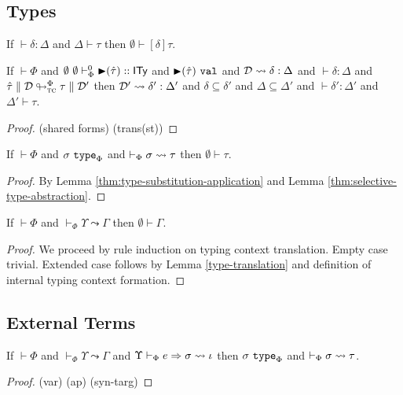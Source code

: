 \documentclass{llncs}
\begin{document}

\subsection{Types}
\begin{lemma}\label{thm:type-substitution-application}
If $\vdash \delta : \Delta$ and $\Delta \vdash \tau$ then $\emptyset \vdash [\delta]\tau$.
\end{lemma}

\begin{lemma}\label{thm:selective-type-abstraction}
If $\vdash \Phi$ and $\emptyset~\emptyset \vdash_{\Phi}^{0} {\blacktriangleright}(\hat{\tau}) :: {\sf ITy}$ and ${\blacktriangleright}(\hat{\tau})~\mathtt{val}$ and $\mathcal{D} \leadsto \delta : \Delta$ and $\vdash \delta : \Delta$ and $\hat{\tau} \parallel \mathcal{D} \looparrowright_{\textsc{tc}}^{\Phi} \tau \parallel \mathcal{D}'$ then $\mathcal{D}' \leadsto \delta' : \Delta'$ and $\delta \subseteq \delta'$ and $\Delta \subseteq \Delta'$ and $\vdash \delta' : \Delta'$ and $\Delta' \vdash \tau$.
\end{lemma}
\begin{proof}
(shared forms) (trans(st))
\end{proof}

\begin{lemma}\label{type-translation}
If $\vdash \Phi$ and $\sigma~\texttt{type}_{\Phi}$ and $\vdash_\Phi \sigma \leadsto \tau$ then $\emptyset \vdash \tau$.
\end{lemma}
\begin{proof} By Lemma \ref{thm:type-substitution-application} and Lemma \ref{thm:selective-type-abstraction}.
\end{proof}

\begin{lemma}
If $\vdash \Phi$ and $\vdash_\Phi \Upsilon \leadsto \Gamma$ then $\emptyset \vdash \Gamma$.\end{lemma}
\begin{proof} We proceed by rule induction on typing context translation. Empty case trivial. Extended case follows by Lemma \ref{type-translation} and definition of internal typing context formation.\end{proof}

\subsection{External Terms}
\begin{theorem}
If $\vdash \Phi$ and $\vdash_\Phi \Upsilon \leadsto \Gamma$ and $\Upsilon \vdash_{\Phi} e \Rightarrow \sigma \leadsto \iota$ then $\sigma~\texttt{type}_{\Phi}$ and $\vdash_\Phi \sigma \leadsto \tau$. \end{theorem}
\begin{proof}
(var) (ap) (syn-targ)
\end{proof}
\end{document}
